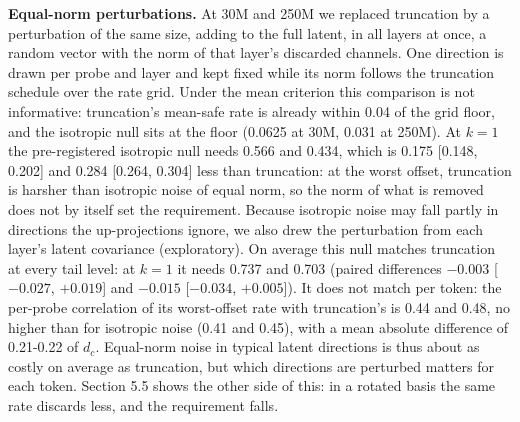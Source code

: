 \documentclass[10pt]{article}
\begin{document}
\textbf{Equal-norm perturbations.} At 30M and 250M we replaced truncation by a perturbation of the same size, adding to the full latent, in all layers at once, a random vector with the norm of that layer's discarded channels. One direction is drawn per probe and layer and kept fixed while its norm follows the truncation schedule over the rate grid. Under the mean criterion this comparison is not informative: truncation's mean-safe rate is already within 0.04 of the grid floor, and the isotropic null sits at the floor (0.0625 at 30M, 0.031 at 250M). At $k=1$ the pre-registered isotropic null needs 0.566 and 0.434, which is 0.175 [0.148, 0.202] and 0.284 [0.264, 0.304] less than truncation: at the worst offset, truncation is harsher than isotropic noise of equal norm, so the norm of what is removed does not by itself set the requirement. Because isotropic noise may fall partly in directions the up-projections ignore, we also drew the perturbation from each layer's latent covariance (exploratory). On average this null matches truncation at every tail level: at $k=1$ it needs 0.737 and 0.703 (paired differences $-0.003$ [$-0.027$, $+0.019$] and $-0.015$ [$-0.034$, $+0.005$]). It does not match per token: the per-probe correlation of its worst-offset rate with truncation's is 0.44 and 0.48, no higher than for isotropic noise (0.41 and 0.45), with a mean absolute difference of 0.21-0.22 of $d_c$. Equal-norm noise in typical latent directions is thus about as costly on average as truncation, but which directions are perturbed matters for each token. Section 5.5 shows the other side of this: in a rotated basis the same rate discards less, and the requirement falls.
\end{document}
